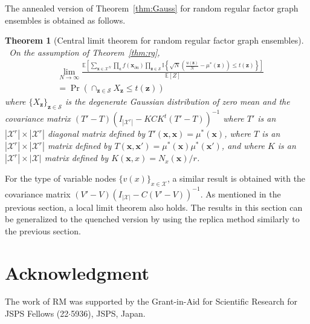 \documentclass[conference,twocolumns]{IEEEtran}
\theoremstyle{plain}
\newtheorem{theorem}{Theorem}
\begin{document}
The annealed version of Theorem~\ref{thm:Gauss} for random regular factor graph ensembles is obtained as follows.
\begin{theorem}[Central limit theorem for random regular factor graph ensembles]~\label{thm:annealG}
On the assumption of Theorem~\ref{thm:rg},
\begin{align*}
&\lim_{N\to\infty}\frac{\mathbb{E}\left[\sum_{\bm{x}\in\mathcal{X}^N} \prod_a f(\bm{x}_{\partial a})
\prod_{\bm{z}\in\mathcal{S}}\mathbb{I}\left\{\sqrt{N}\left(\frac{u(\bm{z})}{N}-\mu^*(\bm{z})\right)\le t(\bm{z})\right\}\right]}{\mathbb{E}[Z]}\\
&=\Pr\left(\cap_{\bm{z}\in\mathcal{S}}X_{\bm{z}}\le t(\bm{z})\right)
\end{align*}
where $\{X_{\bm{z}}\}_{\bm{z}\in\mathcal{S}}$ is the degenerate Gaussian distribution of zero mean and
the covariance matrix $(T'-T)(I_{|\mathcal{X}^r|}- KCK^t(T'-T))^{-1}$
where $T'$ is an $|\mathcal{X}^r|\times|\mathcal{X}^r|$ diagonal matrix defined by $T'(\bm{x},\bm{x})=\mu^*(\bm{x})$,
where $T$ is an $|\mathcal{X}^r|\times|\mathcal{X}^r|$ matrix defined by $T(\bm{x},\bm{x}')=\mu^*(\bm{x})\mu^*(\bm{x}')$,
and where $K$ is an $|\mathcal{X}^r|\times|\mathcal{X}|$ matrix defined by $K(\bm{x},x)=N_x(\bm{x})/r$.
\end{theorem}
For the type of variable nodes $\{v(x)\}_{x\in\mathcal{X}}$, a similar result is obtained with the covariance matrix 
$(V'-V)(I_{|\mathcal{X}|}-C(V'-V))^{-1}$.
As mentioned in the previous section, a local limit theorem also holds.
The results in this section can be generalized to the quenched version by using the replica method similarly to the previous section.


\section*{Acknowledgment}
{\normalsize The work of RM was supported by the Grant-in-Aid for Scientific Research for JSPS Fellows (22$\cdot$5936), JSPS, Japan.}




\end{document}
